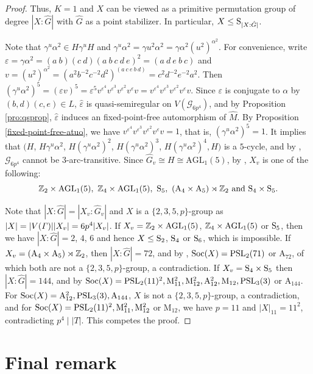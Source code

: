 \documentclass[12pt,reqno]{amsart}
\renewcommand\a{\alpha}  \renewcommand\b{\beta}
\newcommand\A{\mathrm{A}} \newcommand\AGL{\mathrm{AGL}} \newcommand\AGammaL{\mathrm{A\Gamma L}} \newcommand\Alt{\mathrm{Alt}} \newcommand\ASL{\mathrm{ASL}} \newcommand\ASigmaL{\mathrm{A \Sigma L}} \newcommand\Aut{\mathrm{Aut}}
\newcommand\M{\mathrm{M}} \newcommand{\magma}{{\sc Magma}} \renewcommand \mod{{\rm mod~}}
\def\soc{ \mathrm{Soc}}
\newcommand{\cG}{\mathcal{G}}
\numberwithin {equation} {section}
\begin{document}
\begin{proof}
Thus, $K=1$ and $X$ can be viewed as a primitive permutation group of degree $|X{:}\hat{G}|$ with $\hat{G}$ as a point stabilizer. In particular, $X \leq \mathrm{S}_{|X:\hat{G}|}$.

Note that $\gamma^u\a^2\in H\gamma^uH$ and $\gamma^u\a^2=\gamma u^2\a^2=\gamma\a^2(u^2)^{\a^2}$. For convenience, write $\varepsilon=\gamma\alpha^2=(a\ b)(c\ d)(a\ b\ c\ d\ e)^2=(a\ d\ e\ b\ c)$ and $v=(u^2)^{\a^2}=(a^2b^{-2}c^{-2}d^2)^{(a\ c\ e\ b\ d)}=c^2d^{-2}e^{-2}a^2$. Then $(\gamma^u\a^2)^5=(\varepsilon v)^5=\varepsilon^5v^{\varepsilon^4}v^{\varepsilon^3}v^{\varepsilon^2}v^{\varepsilon}v=
v^{\varepsilon^4}v^{\varepsilon^3}v^{\varepsilon^2}v^{\varepsilon}v$.  Since $\varepsilon$ is conjugate to $\alpha$ by $(b,d)(c,e) \in L$, $\hat{\varepsilon}$ is quasi-semiregular on $V(\cG_{6p^4})$, and by Proposition \ref{pro:qsprop}, $\hat{\varepsilon}$ induces an fixed-point-free automorphism of $\hat{M}$. By   Proposition \ref{fixed-point-free-atuo}, we have $v^{\varepsilon^4}v^{\varepsilon^3}v^{\varepsilon^2}v^{\varepsilon}v=1$, that is, $(\gamma^u\a^2)^5=1$.
It implies that $(H$, $H\gamma^u\alpha^2$, $H(\gamma^u\alpha^2)^2$, $H(\gamma^u\alpha^2)^3$, $H(\gamma^u\alpha^2)^4,H)$ is a $5$-cycle, and by \cite[Proposition 17.2]{Biggs}, $\cG_{6p^4}$ cannot be $3$-arc-transitive.
Since $\hat{G}_v\cong H\cong\AGL_1(5)$, by \cite[Theorem 1.1]{Feng-Guo}, $X_v$ is one of the following: \[\ZZ_2 \times \AGL_1(5),\ \ZZ_4 \times \AGL_1(5),\ \Sy_5,\ (\A_4 \times \A_5)\rtimes \ZZ_2 \mbox{ and }\Sy_4 \times\Sy_5.\]

Note that $|X{:}\hat{G}|=|X_v{:}\hat{G}_v|$  and $X$ is a $\{2,3,5,p \}$-group as $|X|=|V({\it \Gamma})||X_v|=6p^4|X_v|$.
If $X_v=\ZZ_2 \times \AGL_1(5)$, $\ZZ_4 \times \AGL_1(5)$ or $\mathrm{S}_5$, then we have $|X{:}\hat{G}|=2$, $4$, $6$  and hence $X\leq\mathrm{S}_2$, $\mathrm{S}_4$ or $\mathrm{S}_6$, which is impossible.
If $X_v=(\A_4 \times \A_5)\rtimes \ZZ_2$, then $|X{:}\hat{G}|=72$, and by  \cite[Appendix B]{DM-book}, $\soc(X)=\PSL_2(71)$ or $\A_{72}$, of which both are not a $\{2,3,5,p \}$-group, a contradiction. If $X_v=\mathrm{S}_4 \times\mathrm{S}_5$ then $|X{:}\hat{G}|=144$, and by  \cite[Appendix B]{DM-book} $\soc(X)=\PSL_2(11)^2,\M_{11}^2,\M_{12}^2,\A_{12}^2,\M_{12},\PSL_3(3)$ or $\A_{144}$. For  $\soc(X)=\A_{12}^2,\PSL_3(3),\A_{144} $, $X$ is not a $\{2,3,5,p \}$-group, a contradiction, and for  $\soc(X)=\PSL_2(11)^2,\M_{11}^2,\M_{12}^2$ or $\M_{12}$, we have $p=11$ and $|X|_{11}=11^2$, contradicting $p^4 \mid |T|$. This competes the proof.
\end{proof}

\section{Final remark}
\end{document}
